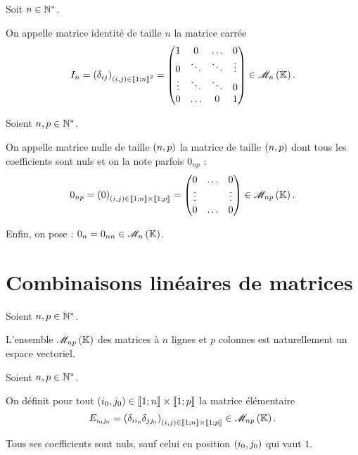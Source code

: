 \begin{nota}
Soit \(n\in\mathbb{N}^*\).

On appelle matrice identité de taille \(n\) la matrice carrée \[I_n=\paren{\delta_{ij}}_{\paren{i,j}\in\interventierii{1}{n}^2}=\begin{pmatrix}
1 & 0 & \dots & 0 \\
0 & \ddots & \ddots & \vdots \\
\vdots & \ddots & \ddots & 0 \\
0 & \dots & 0 & 1
\end{pmatrix}\in\M{n}.\]
\end{nota}

\begin{nota}
Soient \(n,p\in\mathbb{N}^*\).

On appelle matrice nulle de taille \(\left(n,p\right)\) la matrice de taille \(\left(n,p\right)\) dont tous les coefficients sont nuls et on la note parfois \(0_{np}\) : \[0_{np}=\paren{0}_{\paren{i,j}\in\interventierii{1}{n}\times\interventierii{1}{p}}=\begin{pmatrix}
0 & \dots & 0 \\
\vdots & & \vdots \\
0 & \dots & 0
\end{pmatrix}\in\M{np}.\]

Enfin, on pose : \(0_n=0_{nn}\in\M{n}\).
\end{nota}

\section{Combinaisons linéaires de matrices}

\begin{prop}
Soient \(n,p\in\mathbb{N}^*\).

L'ensemble \(\M{np}\) des matrices à \(n\) lignes et \(p\) colonnes est naturellement un espace vectoriel.
\end{prop}

\begin{nota}
Soient \(n,p\in\mathbb{N}^*\).

On définit pour tout \(\left(i_0,j_0\right)\in\left\llbracket1;n\right\rrbracket\times\left\llbracket1;p\right\rrbracket\) la matrice élémentaire \[E_{i_0j_0}=\paren{\delta_{ii_0}\delta_{jj_0}}_{\paren{i,j}\in\interventierii{1}{n}\times\interventierii{1}{p}}\in\M{np}.\]

Tous ses coefficients sont nuls, sauf celui en position \(\left(i_0,j_0\right)\) qui vaut \(1\).
\end{nota}

